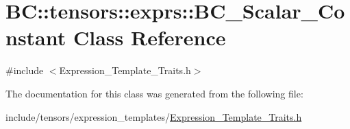 \hypertarget{classBC_1_1tensors_1_1exprs_1_1BC__Scalar__Constant}{}\section{BC\+:\+:tensors\+:\+:exprs\+:\+:B\+C\+\_\+\+Scalar\+\_\+\+Constant Class Reference}
\label{classBC_1_1tensors_1_1exprs_1_1BC__Scalar__Constant}


{\ttfamily \#include $<$Expression\+\_\+\+Template\+\_\+\+Traits.\+h$>$}



The documentation for this class was generated from the following file\+:\begin{DoxyCompactItemize}
\item 
include/tensors/expression\+\_\+templates/\hyperlink{Expression__Template__Traits_8h}{Expression\+\_\+\+Template\+\_\+\+Traits.\+h}\end{DoxyCompactItemize}
